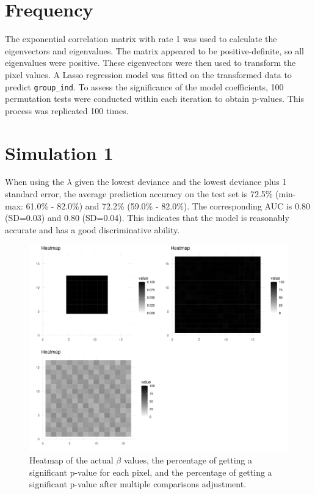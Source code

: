 \documentclass[12pt]{article}
\begin{document}
\section*{Frequency}

The exponential correlation matrix with rate 1 was used to calculate the eigenvectors and eigenvalues. The matrix appeared to be positive-definite, so all eigenvalues were positive. These eigenvectors were then used to transform the pixel values. A Lasso regression model was fitted on the transformed data to predict \texttt{group\_ind}. To assess the significance of the model coefficients, 100 permutation tests were conducted within each iteration to obtain p-values. This process was replicated 100 times.

\clearpage

\section*{Simulation 1}


When using the \(\lambda\) given the lowest deviance and the lowest deviance plus 1 standard error, the average prediction accuracy on the test set is 72.5\% (min-max: 61.0\% - 82.0\%) and 72.2\% (59.0\% - 82.0\%). The corresponding AUC is 0.80 (SD=0.03) and 0.80 (SD=0.04). This indicates that the model is reasonably accurate and has a good discriminative ability.

\begin{figure}[H]
  \centering
  \includegraphics[width=\textwidth]{../Figures/sim1_heatmap.png}
  \caption{Heatmap of the actual \(\beta\) values, the percentage of getting a significant p-value for each pixel, and the percentage of getting a significant p-value after multiple comparisons adjustment.}
  \label{fig:sim1_heatmap}
\end{figure}
\end{document}
